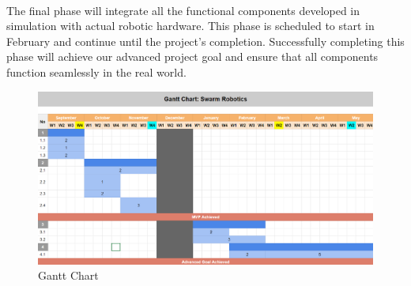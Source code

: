 \paragraph*{}
The final phase will integrate all the functional components developed in simulation with actual robotic hardware. This phase is scheduled to start in February and continue until the project’s completion. Successfully completing this phase will achieve our advanced project goal and ensure that all components function seamlessly in the real world.

\begin{figure}
    \centering
    \includegraphics[width=1\linewidth]{assets/images/timeline/gantt_chart.png}
    \caption{Gantt Chart}
    \label{fig:Project Gantt Chart}
\end{figure}

